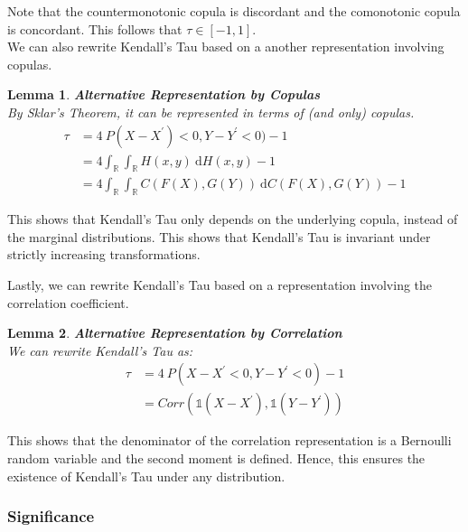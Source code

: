 \documentclass[12pt]{report}
\newtheorem{lemma}{Lemma}[subsection]
\newcommand{\1}{\mathbf{1}}
\begin{document}
\begin{flushleft}
Note that the countermonotonic copula is discordant and the comonotonic copula is concordant. This follows that $\tau \in [-1,1]$.\\
\vspace{0.5cm}
We can also rewrite Kendall's Tau based on a another representation involving copulas.\\

\begin{lemma}
\label{KendallTauGeneralizationCopulas}
\textit{\normalfont\parencite{HofertBook}}\:\textbf{Alternative Representation by Copulas}\\

By Sklar's Theorem, it can be represented in terms of (and only) copulas.
\begin{align*}
\tau &= 4 \: P (X - X^{'}) < 0, Y - Y^{'} < 0) - 1\\
&= 4 \int_{\mathbb{R}} \int_{\mathbb{R}} H(x,y) \: \mathrm{d}H(x,y) - 1 \\
&= 4 \int_{\mathbb{R}} \int_{\mathbb{R}} C(F(X),G(Y)) \: \mathrm{d}C(F(X),G(Y)) - 1
\end{align*}
\end{lemma}

This shows that Kendall's Tau only depends on the underlying copula, instead of the marginal distributions. This shows that Kendall's Tau is invariant under strictly increasing transformations.

Lastly, we can rewrite Kendall's Tau based on a representation involving the correlation coefficient. 

\begin{lemma}
\label{KendallTauGeneralizationCorrelation}
\textit{\normalfont\parencite{HofertBook}} \:\textbf{Alternative Representation by Correlation}\\
We can rewrite Kendall's Tau as:
\begin{align*}
\tau &= 4 \: P (X - X^{'} < 0, Y - Y^{'} < 0) - 1\\
&= Corr \left( \mathds{1}(X - X^{'}), \mathds{1}(Y - Y^{'}) \right)
\end{align*}
\end{lemma}

This shows that the denominator of the correlation representation is a Bernoulli random variable and the second moment is defined. Hence, this ensures the existence of Kendall's Tau under any distribution.

\newpage
\subsubsection{Significance}


\end{flushleft}
\end{document}
